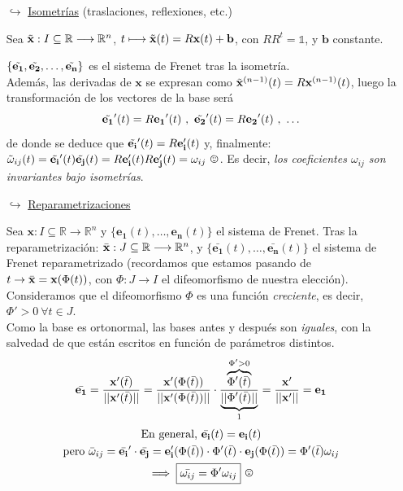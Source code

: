 \begin{enumerate}
    \item[$\hookrightarrow$] \underline{Isometrías} (traslaciones, reflexiones, etc.)

    Sea $\Tilde{\mathbf{x}}:I\subseteq \mathbb{R}\longrightarrow \mathbb{R}^n $, $t\longmapsto \Tilde{\mathbf{x}}(t)=R\mathbf{x}(t)+\mathbf{b}$, con $RR^t=\mathbb{1}$, y $\mathbf{b}$ constante.

    $\{ \Tilde{\mathbf{e_1}},\Tilde{\mathbf{e_2}},\ldots , \Tilde{\mathbf{e_n}} \}$ es el sistema de Frenet tras la isometría.\\

    Además, las derivadas de $\mathbf{x}$ se expresan como $\Tilde{\mathbf{x}}^{(n-1)}(t)=R\mathbf{x}^{(n-1)}(t)$, luego la transformación de los vectores de la base será
    $$
    \Tilde{\mathbf{e_1}}'(t)=R{\mathbf{e_1}}'(t)\ , \ \Tilde{\mathbf{e_2}}'(t)=R{\mathbf{e_2}}'(t)\ , \ \ldots
    $$
    de donde se deduce que $\Tilde{\mathbf{e_i}}'(t)=R\mathbf{e_i'}(t)$ y, finalmente: $\Tilde{\omega}_{ij}(t)=\Tilde{\mathbf{e_i}}'(t)\Tilde{\mathbf{e_j}}(t)=R\mathbf{e_i'}(t)R\mathbf{e_j'}(t)=\omega_{ij} \ \smiley$. Es decir, \emph{los coeficientes $\omega_{ij} $ son invariantes bajo isometrías}.

    \item[$\hookrightarrow$] \underline{Reparametrizaciones}

    Sea $\mathbf{x}:I\subseteq \mathbb{R}\longrightarrow \mathbb{R}^n$ y $\{ \mathbf{e_1}(t), \ldots , \mathbf{e_n}(t) \}$ el sistema de Frenet. Tras la reparametrización: $\Bar{\mathbf{x}}:J\subseteq \mathbb{R}\longrightarrow \mathbb{R}^n$, y $\{ \bar{\mathbf{e_1}}(t), \ldots , \bar{\mathbf{e_n}}(t) \}$ el sistema de Frenet reparametrizado (recordamos que estamos pasando de $t\rightarrow\Bar{\mathbf{x}}=\mathbf{x}(\Phi(t))$, con $\Phi:J\rightarrow I$ el difeomorfismo de nuestra elección).\\

    Consideramos que el difeomorfismo $\Phi$ es una función \emph{creciente}, es decir, $\Phi'>0 \ \forall t\in J$.\\

    Como la base es ortonormal, las bases antes y después son \emph{iguales}, con la salvedad de que están escritos en función de parámetros distintos.
    $$
    \Bar{\mathbf{e_1}}=\frac{\mathbf{x'}(\Bar{t})}{||\mathbf{x'}(\Bar{t})||}=\frac{\mathbf{x'}(\Phi (\Bar{t}))}{||\mathbf{x'}(\Phi (\Bar{t}))||}\cdot \frac{\overbrace{\Phi'(\Bar{t})}^{\Phi'>0}}{\underbrace{||\Phi'(\Bar{t})||}_{1}}=\frac{\mathbf{x'}}{||\mathbf{x'}||}=\mathbf{e_1}
    $$
    \begin{gather*}
        \text{En general, }\Bar{\mathbf{e_i}}(t)=\mathbf{e_i}(t)\\
        \text{pero } \Bar{\omega}_{ij}=\bar{\mathbf{e_i}}'\cdot \Bar{\mathbf{e_j}}=\mathbf{e_i'}(\Phi(\Bar{t}))\cdot \Phi'(\Bar{t}) \cdot \mathbf{e_j}(\Phi(\Bar{t}))=\Phi'(\Bar{t})\omega_{ij}\\
        \implies \boxed{\Bar{\omega_{ij}}=\Phi' \omega_{ij}} \ \frownie
    \end{gather*}


\end{enumerate}
